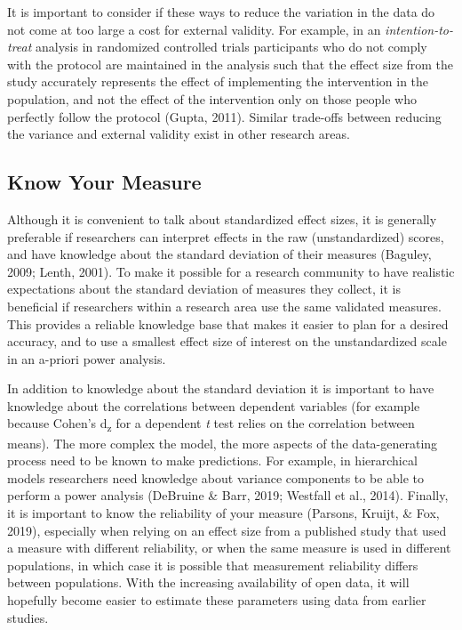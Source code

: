 \documentclass[
  english,
  ,jou, a4paper,floatsintext]{apa6}
\begin{document}
It is important to consider if these ways to reduce the variation in the data do not come at too large a cost for external validity. For example, in an \emph{intention-to-treat} analysis in randomized controlled trials participants who do not comply with the protocol are maintained in the analysis such that the effect size from the study accurately represents the effect of implementing the intervention in the population, and not the effect of the intervention only on those people who perfectly follow the protocol (Gupta, 2011). Similar trade-offs between reducing the variance and external validity exist in other research areas.

\hypertarget{know-your-measure}{%
\subsection{Know Your Measure}\label{know-your-measure}}

Although it is convenient to talk about standardized effect sizes, it is generally preferable if researchers can interpret effects in the raw (unstandardized) scores, and have knowledge about the standard deviation of their measures (Baguley, 2009; Lenth, 2001). To make it possible for a research community to have realistic expectations about the standard deviation of measures they collect, it is beneficial if researchers within a research area use the same validated measures. This provides a reliable knowledge base that makes it easier to plan for a desired accuracy, and to use a smallest effect size of interest on the unstandardized scale in an a-priori power analysis.

In addition to knowledge about the standard deviation it is important to have knowledge about the correlations between dependent variables (for example because Cohen's d\textsubscript{z} for a dependent \emph{t} test relies on the correlation between means). The more complex the model, the more aspects of the data-generating process need to be known to make predictions. For example, in hierarchical models researchers need knowledge about variance components to be able to perform a power analysis (DeBruine \& Barr, 2019; Westfall et al., 2014). Finally, it is important to know the reliability of your measure (Parsons, Kruijt, \& Fox, 2019), especially when relying on an effect size from a published study that used a measure with different reliability, or when the same measure is used in different populations, in which case it is possible that measurement reliability differs between populations. With the increasing availability of open data, it will hopefully become easier to estimate these parameters using data from earlier studies.
\end{document}
